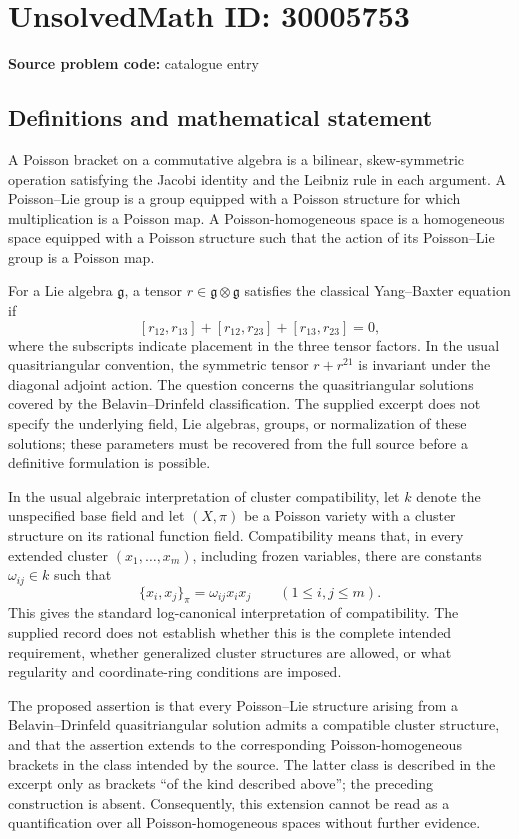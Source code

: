 \documentclass[11pt]{article}
\begin{document}
\section*{UnsolvedMath ID: 30005753}
\textbf{Source problem code:} catalogue entry
\subsection{Definitions and mathematical statement}
A Poisson bracket on a commutative algebra is a bilinear, skew-symmetric operation satisfying the Jacobi identity and the Leibniz rule in each argument. A Poisson--Lie group is a group equipped with a Poisson structure for which multiplication is a Poisson map. A Poisson-homogeneous space is a homogeneous space equipped with a Poisson structure such that the action of its Poisson--Lie group is a Poisson map.

For a Lie algebra \(\mathfrak g\), a tensor \(r\in\mathfrak g\otimes\mathfrak g\) satisfies the classical Yang--Baxter equation if
\[
[r_{12},r_{13}]+[r_{12},r_{23}]+[r_{13},r_{23}]=0,
\]
where the subscripts indicate placement in the three tensor factors. In the usual quasitriangular convention, the symmetric tensor \(r+r^{21}\) is invariant under the diagonal adjoint action. The question concerns the quasitriangular solutions covered by the Belavin--Drinfeld classification. The supplied excerpt does not specify the underlying field, Lie algebras, groups, or normalization of these solutions; these parameters must be recovered from the full source before a definitive formulation is possible.

In the usual algebraic interpretation of cluster compatibility, let \(k\) denote the unspecified base field and let \((X,\pi)\) be a Poisson variety with a cluster structure on its rational function field. Compatibility means that, in every extended cluster \((x_1,\ldots,x_m)\), including frozen variables, there are constants \(\omega_{ij}\in k\) such that
\[
\{x_i,x_j\}_{\pi}=\omega_{ij}x_i x_j
\qquad (1\leq i,j\leq m).
\]
This gives the standard log-canonical interpretation of compatibility. The supplied record does not establish whether this is the complete intended requirement, whether generalized cluster structures are allowed, or what regularity and coordinate-ring conditions are imposed.

The proposed assertion is that every Poisson--Lie structure arising from a Belavin--Drinfeld quasitriangular solution admits a compatible cluster structure, and that the assertion extends to the corresponding Poisson-homogeneous brackets in the class intended by the source. The latter class is described in the excerpt only as brackets ``of the kind described above''; the preceding construction is absent. Consequently, this extension cannot be read as a quantification over all Poisson-homogeneous spaces without further evidence.
\end{document}
